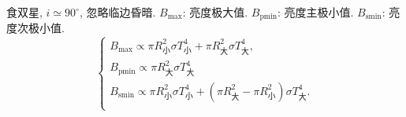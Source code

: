 食双星, $i\simeq90^{\circ}$, 忽略临边昏暗. $B_\text{max}$: 亮度极大值. $B_\text{pmin}$: 亮度主极小值. $B_\text{smin}$: 亮度次极小值.
\begin{equation*}
    \begin{cases}
        B_\text{max} \propto \pi R_\text{小}^2 \sigma T_\text{小}^4 + \pi R_\text{大}^2 \sigma T_\text{大}^4, \\
        B_\text{pmin} \propto \pi R_\text{大}^2 \sigma T_\text{大}^4 \\
        B_\text{smin} \propto \pi R_\text{小}^2 \sigma T_\text{小}^4 + (\pi R_\text{大}^2 - \pi R_\text{小}^2) \sigma T_\text{大}^4. \\
    \end{cases}
\end{equation*}
